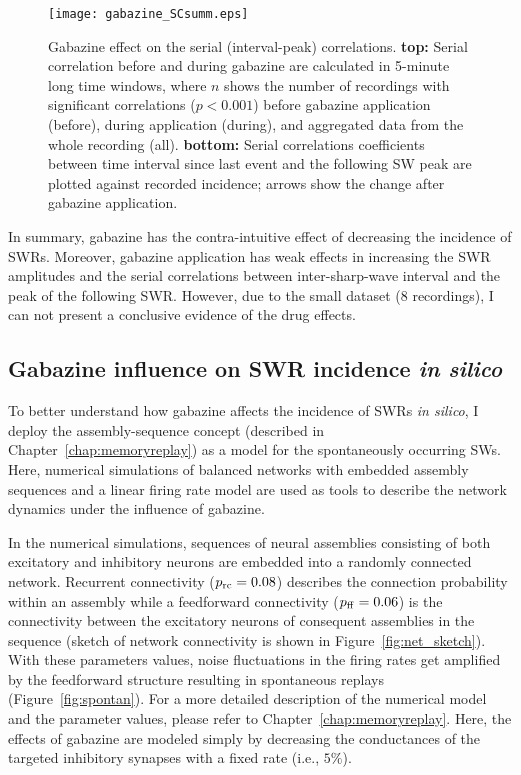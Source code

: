     \begin{figure}
      \texttt{[image: gabazine\_SCsumm.eps]}
      \caption{
        Gabazine effect on the serial (interval-peak) correlations. \textbf{top:} Serial
        correlation before and during gabazine are calculated in 5-minute long
        time windows, where $n$ shows the number of recordings with significant
        correlations ($p<0.001$) before gabazine application (before), during
        application (during), and aggregated data from the whole recording (all). \textbf{bottom:}
        Serial correlations coefficients between time interval since last event and the following SW
        peak are plotted against recorded incidence; arrows show the change
        after gabazine application.
             }
    \label{fig:gabazine_SCsumm}
    \end{figure}

    In summary, gabazine has the contra-intuitive effect of decreasing the
    incidence of SWRs. Moreover, gabazine application has weak effects in
    increasing the SWR amplitudes and the serial correlations between
    inter-sharp-wave interval and the peak of the following SWR. However, due
    to the small dataset (8 recordings), I can not present a conclusive
    evidence of the drug effects.

  \subsection{Gabazine influence on SWR incidence {\textit {in silico} }}
    \label{sec:gabazine_insilico}
    To better understand how gabazine affects the incidence of SWRs
    {\textit {in silico}}, I deploy the assembly-sequence concept (described in
    Chapter~\ref{chap:memoryreplay}) as a model for the spontaneously occurring
    SWs. Here, numerical simulations of balanced networks with embedded assembly
    sequences and a linear firing rate model are used as tools to describe the
    network dynamics under the influence of gabazine.
      
    In the numerical simulations, sequences of neural assemblies consisting of
    both excitatory and inhibitory neurons are embedded into a randomly
    connected network. Recurrent connectivity ($p_{\rm rc}=0.08$) describes the
    connection probability within an assembly while a feedforward connectivity
    ($p_{\rm ff}=0.06$) is the connectivity between the excitatory neurons of
    consequent assemblies in the sequence (sketch of network connectivity is
    shown in Figure~\ref{fig:net_sketch}). With these parameters values, noise
    fluctuations in the firing rates get amplified by the feedforward structure
    resulting in spontaneous replays (Figure~\ref{fig:spontan}). For a more
    detailed description of the numerical model and the parameter values,
    please refer to Chapter~\ref{chap:memoryreplay}. Here, the effects of
    gabazine are modeled simply by decreasing the conductances of the targeted
    inhibitory synapses with a fixed rate (i.e., $5\%$).

